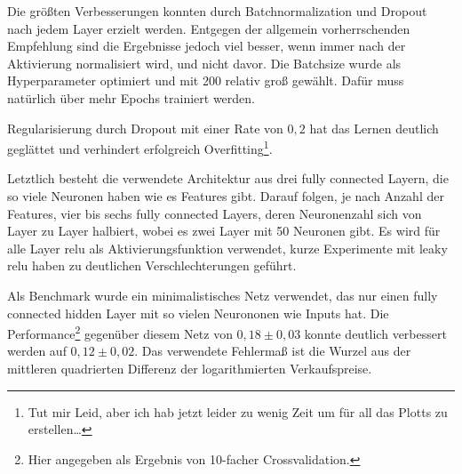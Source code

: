 \documentclass[a4paper, 11pt]{article}
\begin{document}
Die größten Verbesserungen konnten durch Batchnormalization und Dropout nach jedem Layer erzielt werden. Entgegen der allgemein vorherrschenden Empfehlung sind die Ergebnisse jedoch viel besser, wenn immer nach der Aktivierung normalisiert wird, und nicht davor. Die Batchsize wurde als Hyperparameter optimiert und mit 200 relativ groß gewählt. Dafür muss natürlich über mehr Epochs trainiert werden.

Regularisierung durch Dropout mit einer Rate von $0,2$ hat das Lernen deutlich geglättet und verhindert erfolgreich Overfitting\footnote{Tut mir Leid, aber ich hab jetzt leider zu wenig Zeit um für all das Plotts zu erstellen\dots}.

Letztlich besteht die verwendete Architektur aus drei fully connected Layern, die so viele Neuronen haben wie es Features gibt. Darauf folgen, je nach Anzahl der Features, vier bis sechs fully connected Layers, deren Neuronenzahl sich von Layer zu Layer halbiert, wobei es zwei Layer mit 50 Neuronen gibt. Es wird für alle Layer relu als Aktivierungsfunktion verwendet, kurze Experimente mit leaky relu haben zu deutlichen Verschlechterungen geführt.

Als Benchmark wurde ein minimalistisches Netz verwendet, das nur einen fully connected hidden Layer mit so vielen Neurononen wie Inputs hat. Die Performance\footnote{Hier angegeben als Ergebnis von 10-facher Crossvalidation.} gegenüber diesem Netz von $0,18 \pm 0,03$ konnte deutlich verbessert werden auf $0,12 \pm 0,02$. Das verwendete Fehlermaß ist die Wurzel aus der mittleren quadrierten Differenz der logarithmierten Verkaufspreise.
\end{document}
